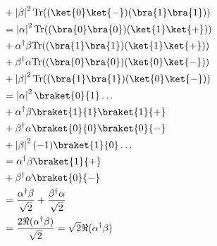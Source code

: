\documentclass{article}
\newcommand{\trace}{{\rm Tr}}
\newcommand{\abs}[1]{\left\lvert #1 \right\rvert}
\begin{document}
\begin{enumerate}
\begin{enumerate}
$$\begin{aligned}
                                                              & + \abs{\beta}^2\trace((\ket{0}\ket{-})(\bra{1}\bra{1}))                                                          \\
                                                              & = \abs{\alpha}^2\trace((\bra{0}\bra{0})(\ket{1}\ket{+}))                                                         \\
                                                              & + \alpha^\dagger\beta\trace((\bra{1}\bra{1})(\ket{1}\ket{+}))                                                    \\
                                                              & + \beta^\dagger\alpha\trace((\bra{0}\bra{0})(\ket{0}\ket{-}))                                                    \\
                                                              & + \abs{\beta}^2\trace((\bra{1}\bra{1})(\ket{0}\ket{-}))                                                          \\
                                                              & = \abs{\alpha}^2\braket{0}{1}\dots                                                                               \\
                                                              & + \alpha^\dagger\beta\braket{1}{1}\braket{1}{+}                                                                  \\
                                                              & + \beta^\dagger\alpha\braket{0}{0}\braket{0}{-}                                                                  \\
                                                              & + \abs{\beta}^2(-1)\braket{1}{0}\dots                                                                            \\
                                                              & = \alpha^\dagger\beta\braket{1}{+}                                                                               \\
                                                              & + \beta^\dagger\alpha\braket{0}{-}                                                                               \\
                                                              & = \frac{\alpha^\dagger\beta}{\sqrt{2}} + \frac{\beta^\dagger\alpha}{\sqrt{2}}                                    \\
                                                              & = \frac{2\Re(\alpha^\dagger\beta)}{\sqrt{2}}=\sqrt{2}\Re(\alpha^\dagger\beta)                                    \\
                  \end{aligned}$$


\end{enumerate}
\end{enumerate}
\end{document}
